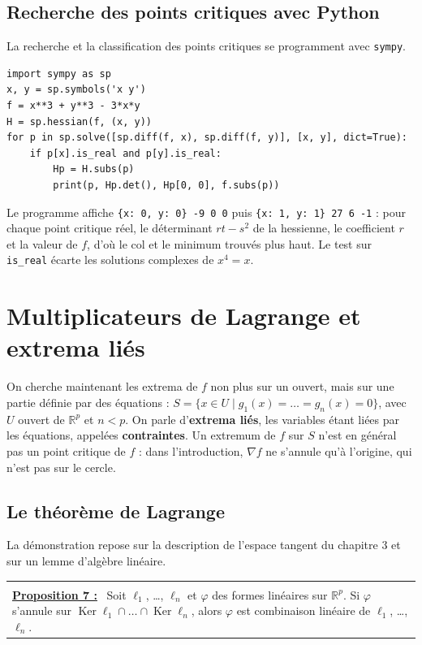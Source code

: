 \documentclass[a4paper,twoside]{report}
\makeatletter
\newcommand{\mot}[1]{\textcolor{rougecours}{\textbf{#1}}}
\newenvironment{cadre}%
 {\par\vspace{2mm}\noindent\begin{tabular}{|@{\hspace{4mm}}p{0.93\textwidth}@{\hspace{4mm}}|}
  \hline \\[-2mm]}%
 {\\[2mm] \hline \end{tabular}\par\vspace{3mm}}
\newcommand{\propo}[1]{\textbf{\underline{Proposition #1 :}}~}
\newcommand{\R}{\mathbb{R}}
\newcommand{\Ker}{\operatorname{Ker}}
\newcommand{\grad}{\nabla}                        %
\makeatother
\begin{document}
\subsection{Recherche des points critiques avec Python}

La recherche et la classification des points critiques se programment avec \texttt{sympy}.

\begin{lstlisting}
import sympy as sp
x, y = sp.symbols('x y')
f = x**3 + y**3 - 3*x*y
H = sp.hessian(f, (x, y))
for p in sp.solve([sp.diff(f, x), sp.diff(f, y)], [x, y], dict=True):
    if p[x].is_real and p[y].is_real:
        Hp = H.subs(p)
        print(p, Hp.det(), Hp[0, 0], f.subs(p))
\end{lstlisting}

\noindent Le programme affiche \texttt{\{x: 0, y: 0\} -9 0 0} puis \texttt{\{x: 1, y: 1\} 27 6 -1} : pour chaque point critique réel, le déterminant $rt - s^{2}$ de la hessienne, le coefficient $r$ et la valeur de $f$, d'où le col et le minimum trouvés plus haut. Le test sur \texttt{is\_real} écarte les solutions complexes de $x^{4} = x$.
\section[Extrema liés]{Multiplicateurs de Lagrange et extrema liés}

On cherche maintenant les extrema de $f$ non plus sur un ouvert, mais sur une partie définie par des équations : $S = \{x \in U \mid g_{1}(x) = \dots = g_{n}(x) = 0\}$, avec $U$ ouvert de $\R^{p}$ et $n < p$. On parle d'\mot{extrema liés}, les variables étant liées par les équations, appelées \mot{contraintes}. Un extremum de $f$ sur $S$ n'est en général pas un point critique de $f$ : dans l'introduction, $\grad f$ ne s'annule qu'à l'origine, qui n'est pas sur le cercle.

\subsection{Le théorème de Lagrange}

La démonstration repose sur la description de l'espace tangent du chapitre 3 et sur un lemme d'algèbre linéaire.

\begin{cadre}
\propo{7} Soit $\ell_{1}$, \dots, $\ell_{n}$ et $\varphi$ des formes linéaires sur $\R^{p}$. Si $\varphi$ s'annule sur $\Ker\ell_{1} \cap \dots \cap \Ker\ell_{n}$, alors $\varphi$ est combinaison linéaire de $\ell_{1}$, \dots, $\ell_{n}$.
\end{cadre}
\end{document}
